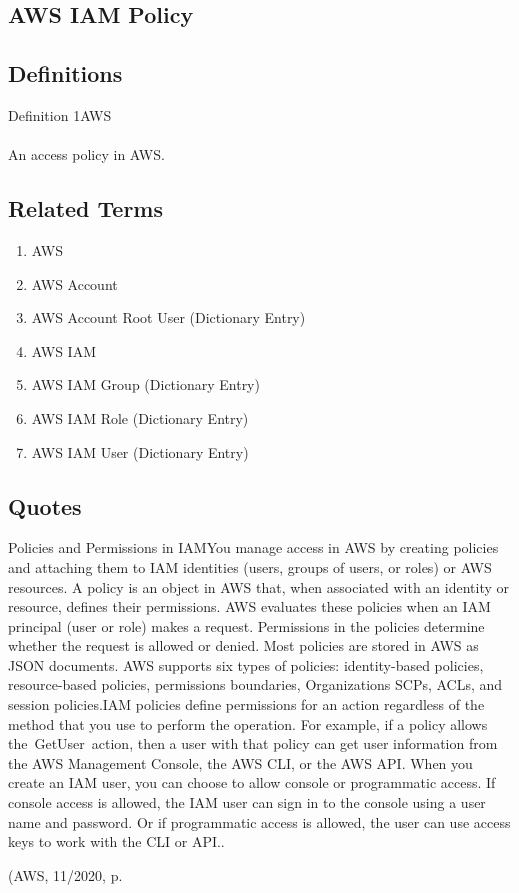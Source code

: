 \newpage \subsection*{AWS IAM Policy } \subsection*{Definitions } \begin{DIC_Def}{Definition 1AWS }{} \paragraph{} An access policy in AWS.  \end{DIC_Def} \subsection*{Related Terms } \begin{enumerate} \item  AWS  \item  AWS Account  \item  AWS Account Root User (Dictionary Entry)    \item  AWS IAM  \item  AWS IAM Group (Dictionary Entry)    \item  AWS IAM Role (Dictionary Entry)    \item  AWS IAM User (Dictionary Entry)    \end{enumerate} \subsection*{Quotes } \begin{DIC_BlockQuote} Policies and Permissions in IAMYou manage access in AWS by creating policies and attaching them to IAM identities (users, groups of users, or roles) or AWS resources. A policy is an object in AWS that, when associated with an identity or resource, defines their permissions. AWS evaluates these policies when an IAM principal (user or role) makes a request. Permissions in the policies determine whether the request is allowed or denied. Most policies are stored in AWS as JSON documents. AWS supports six types of policies: identity-based policies, resource-based policies, permissions boundaries, Organizations SCPs, ACLs, and session policies.IAM policies define permissions for an action regardless of the method that you use to perform the operation. For example, if a policy allows the~GetUser~action, then a user with that policy can get user information from the AWS Management Console, the AWS CLI, or the AWS API. When you create an IAM user, you can choose to allow console or programmatic access. If console access is allowed, the IAM user can sign in to the console using a user name and password. Or if programmatic access is allowed, the user can use access keys to work with the CLI or API..  \end{DIC_BlockQuote} (AWS, 11/2020, p. 